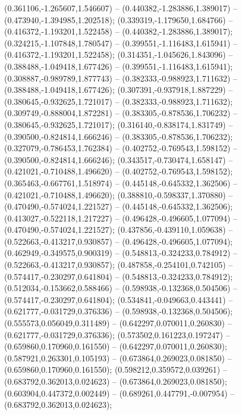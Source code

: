  (0.361106,-1.265607,1.546607) -- (0.440382,-1.283886,1.389017) -- (0.473940,-1.394985,1.202518);
 (0.339319,-1.179650,1.684766) -- (0.416372,-1.193201,1.522458) -- (0.440382,-1.283886,1.389017);
 (0.324215,-1.107848,1.780547) -- (0.399551,-1.116483,1.615941) -- (0.416372,-1.193201,1.522458);
 (0.314351,-1.045626,1.843096) -- (0.388488,-1.049418,1.677426) -- (0.399551,-1.116483,1.615941);
 (0.308887,-0.989789,1.877743) -- (0.382333,-0.988923,1.711632) -- (0.388488,-1.049418,1.677426);
 (0.307391,-0.937918,1.887229) -- (0.380645,-0.932625,1.721017) -- (0.382333,-0.988923,1.711632);
 (0.309749,-0.888004,1.872281) -- (0.383305,-0.878536,1.706232) -- (0.380645,-0.932625,1.721017);
 (0.316140,-0.838174,1.831749) -- (0.390500,-0.824814,1.666246) -- (0.383305,-0.878536,1.706232);
 (0.327079,-0.786453,1.762384) -- (0.402752,-0.769543,1.598152) -- (0.390500,-0.824814,1.666246);
 (0.343517,-0.730474,1.658147) -- (0.421021,-0.710488,1.496620) -- (0.402752,-0.769543,1.598152);
 (0.365463,-0.667761,1.518974) -- (0.445148,-0.645332,1.362506) -- (0.421021,-0.710488,1.496620);
 (0.388810,-0.598337,1.370880) -- (0.470490,-0.574024,1.221527) -- (0.445148,-0.645332,1.362506);
 (0.413027,-0.522118,1.217227) -- (0.496428,-0.496605,1.077094) -- (0.470490,-0.574024,1.221527);
 (0.437856,-0.439110,1.059638) -- (0.522663,-0.413217,0.930857) -- (0.496428,-0.496605,1.077094);
 (0.462949,-0.349575,0.900319) -- (0.548813,-0.324233,0.784912) -- (0.522663,-0.413217,0.930857);
 (0.487858,-0.254101,0.742105) -- (0.574417,-0.230297,0.641804) -- (0.548813,-0.324233,0.784912);
 (0.512034,-0.153662,0.588466) -- (0.598938,-0.132368,0.504506) -- (0.574417,-0.230297,0.641804);
 (0.534841,-0.049663,0.443441) -- (0.621777,-0.031729,0.376336) -- (0.598938,-0.132368,0.504506);
 (0.555573,0.056049,0.311489) -- (0.642297,0.070011,0.260830) -- (0.621777,-0.031729,0.376336);
 (0.573502,0.161223,0.197247) -- (0.659860,0.170960,0.161550) -- (0.642297,0.070011,0.260830);
 (0.587921,0.263301,0.105193) -- (0.673864,0.269023,0.081850) -- (0.659860,0.170960,0.161550);
 (0.598212,0.359572,0.039261) -- (0.683792,0.362013,0.024623) -- (0.673864,0.269023,0.081850);
 (0.603904,0.447372,0.002449) -- (0.689261,0.447791,-0.007954) -- (0.683792,0.362013,0.024623);
